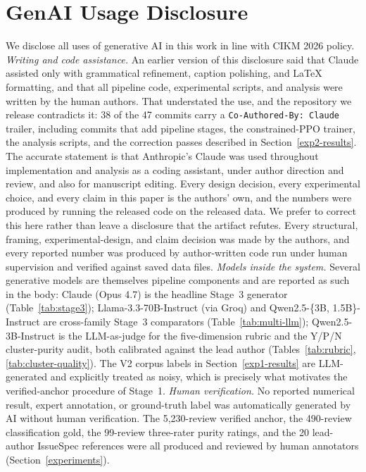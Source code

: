 \documentclass[sigconf, anonymous]{acmart}
\begin{document}
\section*{GenAI Usage Disclosure}
We disclose all uses of generative AI in this work in line with CIKM 2026 policy. \emph{Writing and code assistance.} An earlier version of this disclosure said that Claude
assisted only with grammatical refinement, caption polishing, and LaTeX formatting, and that all
pipeline code, experimental scripts, and analysis were written by the human authors. That
understated the use, and the repository we release contradicts it: 38 of the 47 commits carry a
\texttt{Co-Authored-By: Claude} trailer, including commits that add pipeline stages, the
constrained-PPO trainer, the analysis scripts, and the correction passes described in
Section~\ref{exp2-results}. The accurate statement is that Anthropic's Claude was used
throughout implementation and analysis as a coding assistant, under author direction and review,
and also for manuscript editing. Every design decision, every experimental choice, and every
claim in this paper is the authors' own, and the numbers were produced by running the released
code on the released data. We prefer to correct this here rather than leave a disclosure that
the artifact refutes. Every structural, framing, experimental-design, and claim decision was made by the authors, and every reported number was produced by author-written code run under human supervision and verified against saved data files. \emph{Models inside the system.} Several generative models are themselves pipeline components and are reported as such in the body: Claude (Opus 4.7) is the headline Stage~3 generator (Table~\ref{tab:stage3}); Llama-3.3-70B-Instruct (via Groq) and Qwen2.5-\{3B, 1.5B\}-Instruct are cross-family Stage~3 comparators (Table~\ref{tab:multi-llm}); Qwen2.5-3B-Instruct is the LLM-as-judge for the five-dimension rubric and the Y/P/N cluster-purity audit, both calibrated against the lead author (Tables~\ref{tab:rubric}, \ref{tab:cluster-quality}). The V2 corpus labels in Section~\ref{exp1-results} are LLM-generated and explicitly treated as
   noisy, which is precisely what motivates the verified-anchor procedure of Stage~1. \emph{Human verification.} No reported numerical result, expert annotation, or ground-truth label was automatically generated by AI without human verification. The 5{,}230-review verified anchor, the 490-review classification gold, the 99-review three-rater purity ratings, and the 20 lead-author IssueSpec references were all produced and reviewed by human annotators (Section~\ref{experiments}).
\end{document}
